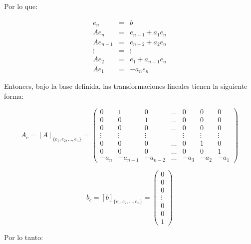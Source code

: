         Por lo que:

        \begin{eqnarray}
        e_n & = & b \nonumber \\
        A e_{n} & = & e_{n-1} + a_1 e_n \nonumber \\
        A e_{n-1} & = & e_{n-2} + a_2 e_n \nonumber \\
        \vdots & = & \vdots \nonumber \\
        A e_2 & = & e_1 + a_{n-1} e_n \nonumber \\
        A e_1 & = & - a_{n} e_n
        \end{eqnarray}

        Entonces, bajo la base definida, las transformaciones lineales tienen la siguiente forma:

        \begin{equation}
            A_c = \left[ A \right]_{\{ e_1, e_2, \dots, e_n \}} =
            \begin{pmatrix}
            0 & 1 & 0 & \dots & 0 & 0 & 0 \\
            0 & 0 & 1 & \dots & 0 & 0 & 0 \\
            0 & 0 & 0 & \dots & 0 & 0 & 0 \\
            \vdots & \vdots & \vdots & & \vdots & \vdots & \vdots \\
            0 & 0 & 0 & \dots & 0 & 1 & 0 \\
            0 & 0 & 0 & \dots & 0 & 0 & 1 \\
            -a_{n} & -a_{n-1} & -a_{n-2} & \dots & -a_{3} & -a_{2} & -a_{1}
            \end{pmatrix}
        \end{equation}

        \begin{equation}
            b_c = \left[ b \right]_{\{ e_1, e_2, \dots, e_n \}} =
            \begin{pmatrix}
            0 \\
            0 \\
            0 \\
            \vdots \\
            0 \\
            0 \\
            1
            \end{pmatrix}
        \end{equation}

        Por lo tanto:


